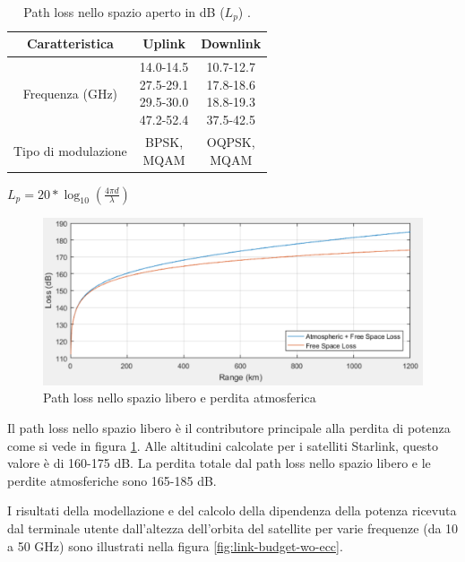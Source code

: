 \begin{table}[h]
\centering
\begin{tabular}{|c|c|c|}
\hline
\textbf{Caratteristica} & \textbf{Uplink} & \textbf{Downlink} \\ \hline
Frequenza (GHz)  & \makecell{14.0-14.5 \\ 27.5-29.1 \\ 29.5-30.0 \\ 47.2-52.4}  & \makecell{10.7-12.7\\17.8-18.6\\18.8-19.3\\37.5-42.5} \\ \hline
Tipo di modulazione  & \makecell{\ac{BPSK},\\M\ac{QAM}} & \makecell{\ac{OQPSK},\\M\ac{QAM}} \\ \hline
\end{tabular}
\caption{Path loss nello spazio aperto in dB ($L_p$) \cite{rozenvasser_estimation_2023}.}
\label{tab:starlink-frequency-allocation-modulation-type}
\end{table}

$L_p = 20 * \log_{10} (\frac{4 \pi d}{\lambda})$

\begin{figure}[htbp]
  \centering
  \includegraphics[width=0.8\linewidth]{./res/img/free_space_path_loss_atm_loss.png}
  \caption{Path loss nello spazio libero e perdita atmosferica}
  \label{fig:free-space-path-loss-atm-loss}
\end{figure}

Il path loss nello spazio libero è il contributore principale alla perdita di potenza come si vede in figura \ref{fig:free-space-path-loss-atm-loss}.
Alle altitudini calcolate per i satelliti Starlink, questo valore è di 160-175 dB.
La perdita totale dal path loss nello spazio libero e le perdite atmosferiche sono 165-185 dB.

I risultati della modellazione e del calcolo della dipendenza della potenza ricevuta dal terminale utente dall'altezza dell'orbita del satellite per varie frequenze (da 10 a 50 GHz) sono illustrati nella figura \ref{fig:link-budget-wo-ecc}.

